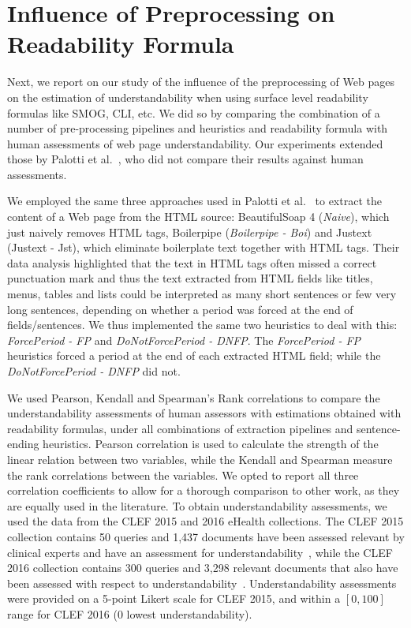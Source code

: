 
\section{Influence of Preprocessing on Readability Formula}
\label{sec:which_readability}

Next, we report on our study of the influence of the preprocessing of Web pages on the estimation of understandability when using surface level readability formulas like SMOG, CLI, etc. We did so by comparing the combination of a number of pre-processing pipelines and heuristics and readability formula with human assessments of web page understandability. 
Our experiments extended those by Palotti et al.~\cite{palotti15}, who did not compare their results against human assessments. 

We employed the same three approaches used in Palotti et al.~\cite{palotti15} to extract the content of a Web page from the HTML source: BeautifulSoap 4 (\textit{Naive}), which just naively removes HTML tags, Boilerpipe\cite{kohlschutter10} (\textit{Boilerpipe - Boi}) and Justext\cite{jan11} ({Justext - Jst}), which eliminate boilerplate text together with HTML tags. 
Their data analysis highlighted that the text in HTML tags often missed a correct punctuation mark and thus the text extracted from HTML fields like titles, menus, tables and lists could be interpreted as many short sentences or few very long sentences, depending on whether a period was forced at the end of fields/sentences. We thus implemented the same two heuristics to deal with this: \textit{ForcePeriod - FP} and \textit{DoNotForcePeriod - DNFP}. The \textit{ForcePeriod - FP} heuristics forced a period at the end of each extracted HTML field; while the \textit{DoNotForcePeriod - DNFP} did not. 

We used Pearson, Kendall and Spearman's Rank correlations to compare the understandability assessments of human assessors with estimations obtained with readability formulas, under all combinations of extraction pipelines and sentence-ending heuristics. Pearson correlation is used to calculate the strength of the linear relation between two variables, while the Kendall and Spearman measure the rank correlations between the variables. We opted to report all three correlation coefficients to allow for a thorough comparison to other work, as they are equally used in the literature. To obtain understandability assessments, we used the data from the CLEF 2015 and 2016 eHealth collections. The CLEF 2015 collection contains 50 queries and 1,437 documents have been assessed relevant by clinical experts and have an assessment for understandability~\cite{clef15}, while the CLEF 2016 collection contains 300 queries and 3,298 relevant documents that also have been assessed with respect to understandability~\cite{clef16}. Understandability assessments were provided on a 5-point Likert scale for CLEF 2015, and within a $[0,100]$ range for CLEF 2016 (0 lowest understandability). 

